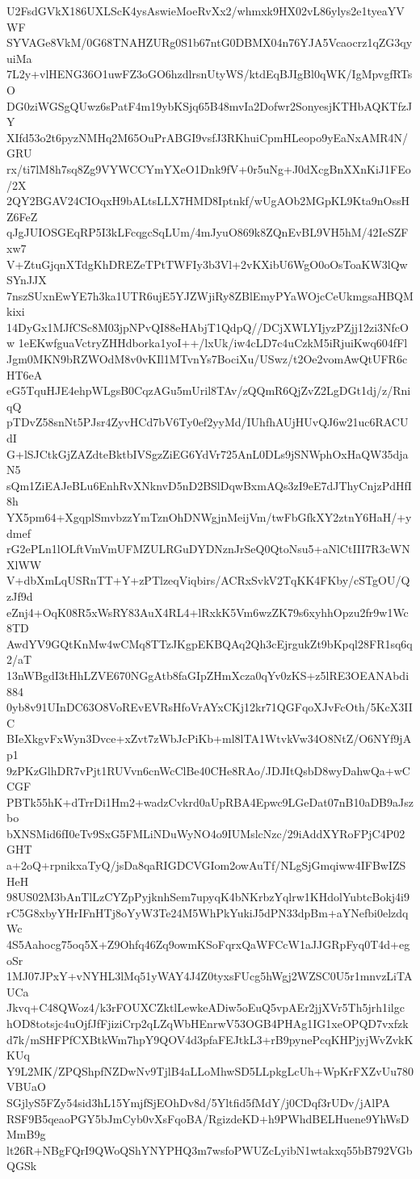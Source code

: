 U2FsdGVkX186UXLScK4ysAswieMoeRvXx2/whmxk9HX02vL86ylys2e1tyeaYVWF
SYVAGe8VkM/0G68TNAHZURg0S1b67ntG0DBMX04n76YJA5Vcaocrz1qZG3qyuiMa
7L2y+vlHENG36O1uwFZ3oGO6hzdlrsnUtyWS/ktdEqBJIgBl0qWK/IgMpvgfRTsO
DG0ziWGSgQUwz6sPatF4m19ybKSjq65B48mvIa2Dofwr2SonyesjKTHbAQKTfzJY
XIfd53o2t6pyzNMHq2M65OuPrABGI9vsfJ3RKhuiCpmHLeopo9yEaNxAMR4N/GRU
rx/ti7lM8h7sq8Zg9VYWCCYmYXeO1Dnk9fV+0r5uNg+J0dXcgBnXXnKiJ1FEo/2X
2QY2BGAV24CIOqxH9bALtsLLX7HMD8Iptnkf/wUgAOb2MGpKL9Kta9nOssHZ6FeZ
qJgJUIOSGEqRP5I3kLFcqgcSqLUm/4mJyuO869k8ZQnEvBL9VH5hM/42IeSZFxw7
V+ZtuGjqnXTdgKhDREZeTPtTWFIy3b3Vl+2vKXibU6WgO0oOsToaKW3lQwSYnJJX
7nszSUxnEwYE7h3ka1UTR6ujE5YJZWjiRy8ZBlEmyPYaWOjcCeUkmgsaHBQMkixi
14DyGx1MJfCSc8M03jpNPvQI88eHAbjT1QdpQ//DCjXWLYIjyzPZjj12zi3NfcOw
1eEKwfguaVctryZHHdborka1yoI++/lxUk/iw4cLD7c4uCzkM5iRjuiKwq604fFl
Jgm0MKN9bRZWOdM8v0vKIl1MTvnYs7BociXu/USwz/t2Oe2vomAwQtUFR6cHT6eA
eG5TquHJE4ehpWLgsB0CqzAGu5mUril8TAv/zQQmR6QjZvZ2LgDGt1dj/z/RniqQ
pTDvZ58snNt5PJsr4ZyvHCd7bV6Ty0ef2yyMd/IUhfhAUjHUvQJ6w21uc6RACUdI
G+lSJCtkGjZAZdteBktbIVSgzZiEG6YdVr725AnL0DLs9jSNWphOxHaQW35djaN5
sQm1ZiEAJeBLu6EnhRvXNknvD5nD2BSlDqwBxmAQs3zI9eE7dJThyCnjzPdHfI8h
YX5pm64+XgqplSmvbzzYmTznOhDNWgjnMeijVm/twFbGfkXY2ztnY6HaH/+ydmef
rG2ePLn1lOLftVmVmUFMZULRGuDYDNznJrSeQ0QtoNsu5+aNlCtIII7R3cWNXlWW
V+dbXmLqUSRnTT+Y+zPTlzeqViqbirs/ACRxSvkV2TqKK4FKby/cSTgOU/QzJf9d
eZnj4+OqK08R5xWsRY83AuX4RL4+lRxkK5Vm6wzZK79s6xyhhOpzu2fr9w1Wc8TD
AwdYV9GQtKnMw4wCMq8TTzJKgpEKBQAq2Qh3cEjrgukZt9bKpql28FR1sq6q2/aT
13nWBgdI3tHhLZVE670NGgAtb8faGIpZHmXcza0qYv0zKS+z5lRE3OEANAbdi884
0yb8v91UInDC63O8VoREvEVRsHfoVrAYxCKj12kr71QGFqoXJvFcOth/5KcX3IIC
BIeXkgvFxWyn3Dvce+xZvt7zWbJcPiKb+ml8lTA1WtvkVw34O8NtZ/O6NYf9jAp1
9zPKzGlhDR7vPjt1RUVvn6cnWcClBe40CHe8RAo/JDJItQsbD8wyDahwQa+wCCGF
PBTk55hK+dTrrDi1Hm2+wadzCvkrd0aUpRBA4Epwc9LGeDat07nB10aDB9aJszbo
bXNSMid6fI0eTv9SxG5FMLiNDuWyNO4o9IUMslcNzc/29iAddXYRoFPjC4P02GHT
a+2oQ+rpnikxaTyQ/jsDa8qaRIGDCVGIom2owAuTf/NLgSjGmqiww4IFBwIZSHeH
98US02M3bAnTlLzCYZpPyjknhSem7upyqK4bNKrbzYqlrw1KHdolYubtcBokj4i9
rC5G8xbyYHrIFnHTj8oYyW3Te24M5WhPkYukiJ5dPN33dpBm+aYNefbi0elzdqWc
4S5Aahocg75oq5X+Z9Ohfq46Zq9owmKSoFqrxQaWFCcW1aJJGRpFyq0T4d+egoSr
1MJ07JPxY+vNYHL3lMq51yWAY4J4Z0tyxsFUcg5hWgj2WZSC0U5r1mnvzLiTAUCa
Jkvq+C48QWoz4/k3rFOUXCZktlLewkeADiw5oEuQ5vpAEr2jjXVr5Th5jrh1ilgc
hOD8totsjc4uOjfJfFjiziCrp2qLZqWbHEnrwV53OGB4PHAg1IG1xeOPQD7vxfzk
d7k/mSHFPfCXBtkWm7hpY9QOV4d3pfaFEJtkL3+rB9pynePcqKHPjyjWvZvkKKUq
Y9L2MK/ZPQShpfNZDwNv9TjlB4aLLoMhwSD5LLpkgLcUh+WpKrFXZvUu780VBUaO
SGjlyS5FZy54sid3hL15YmjfSjEOhDv8d/5Yltfid5fMdY/j0CDqf3rUDv/jAlPA
RSF9B5qeaoPGY5bJmCyb0vXsFqoBA/RgizdeKD+h9PWhdBELHuene9YhWsDMmB9g
lt26R+NBgFQrI9QWoQShYNYPHQ3m7wsfoPWUZcLyibN1wtakxq55bB792VGbQGSk
